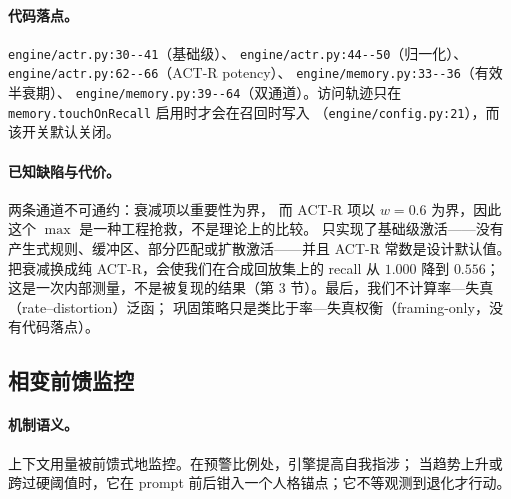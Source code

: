 \paragraph{代码落点。} \texttt{engine/\allowbreak{}actr.\allowbreak{}py:\allowbreak{}30-\allowbreak{}-\allowbreak{}41}（基础级）、
\texttt{engine/\allowbreak{}actr.\allowbreak{}py:\allowbreak{}44-\allowbreak{}-\allowbreak{}50}（归一化）、
\texttt{engine/\allowbreak{}actr.\allowbreak{}py:\allowbreak{}62-\allowbreak{}-\allowbreak{}66}（ACT-R potency）、
\texttt{engine/\allowbreak{}memory.\allowbreak{}py:\allowbreak{}33-\allowbreak{}-\allowbreak{}36}（有效半衰期）、
\texttt{engine/\allowbreak{}memory.\allowbreak{}py:\allowbreak{}39-\allowbreak{}-\allowbreak{}64}（双通道）。访问轨迹只在
\texttt{memory.\allowbreak{}touchOnRecall} 启用时才会在召回时写入
（\texttt{engine/\allowbreak{}config.\allowbreak{}py:\allowbreak{}21}），而该开关默认关闭。

\paragraph{已知缺陷与代价。} 两条通道不可通约：衰减项以重要性为界，
而 ACT-R 项以 $w=0.6$ 为界，因此这个 $\max$ 是一种工程抢救，不是理论上的比较。
只实现了基础级激活——没有产生式规则、缓冲区、部分匹配或扩散激活——并且 ACT-R 常数是设计默认值。
把衰减换成纯 ACT-R，会使我们在合成回放集上的 recall 从 $1.000$ 降到 $0.556$；
这是一次内部测量，不是被复现的结果（第 3 节）。最后，我们不计算率—失真（rate--distortion）泛函；
巩固策略只是类比于率—失真权衡（framing-only，没有代码落点）。

\subsection{相变前馈监控}

\paragraph{机制语义。} 上下文用量被前馈式地监控。在预警比例处，引擎提高自我指涉；
当趋势上升或跨过硬阈值时，它在 prompt 前后钳入一个人格锚点；它不等观测到退化才行动。

